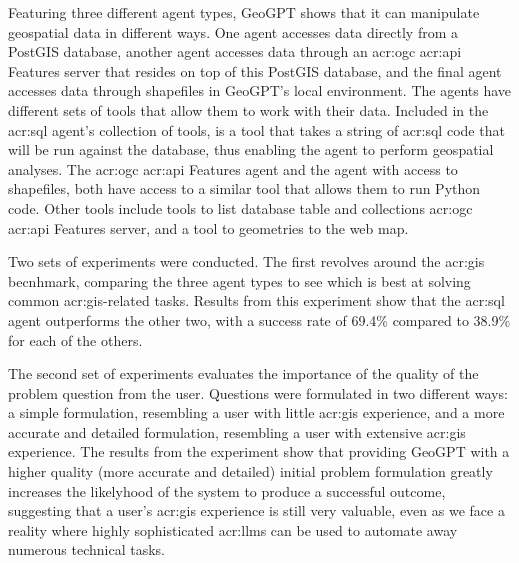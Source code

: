 Featuring three different agent types, GeoGPT shows that it can manipulate geospatial data in different ways. One agent accesses data directly from a PostGIS database, another agent accesses data through an \acrshort{acr:ogc} \acrshort{acr:api} Features server that resides on top of this PostGIS database, and the final agent accesses data through shapefiles in GeoGPT's local environment. The agents have different sets of tools that allow them to work with their data. Included in the \acrshort{acr:sql} agent's collection of tools, is a tool that takes a string of \acrshort{acr:sql} code that will be run against the database, thus enabling the agent to perform geospatial analyses. The \acrshort{acr:ogc} \acrshort{acr:api} Features agent and the agent with access to shapefiles, both have access to a similar tool that allows them to run Python code. Other tools include tools to list database table and collections \acrshort{acr:ogc} \acrshort{acr:api} Features server, and a tool to geometries to the web map.


Two sets of experiments were conducted. The first revolves around the \acrshort{acr:gis} becnhmark, comparing the three agent types to see which is best at solving common \acrshort{acr:gis}-related tasks. Results from this experiment show that the \acrshort{acr:sql} agent outperforms the other two, with a success rate of 69.4\% compared to 38.9\% for each of the others.

The second set of experiments evaluates the importance of the quality of the problem question from the user. Questions were formulated in two different ways: a simple formulation, resembling a user with little \acrshort{acr:gis} experience, and a more accurate and detailed formulation, resembling a user with extensive \acrshort{acr:gis} experience. The results from the experiment show that providing GeoGPT with a higher quality (more accurate and detailed) initial problem formulation greatly increases the likelyhood of the system to produce a successful outcome, suggesting that a user's \acrshort{acr:gis} experience is still very valuable, even as we face a reality where highly sophisticated \glspl{acr:llm} can be used to automate away numerous technical tasks.
